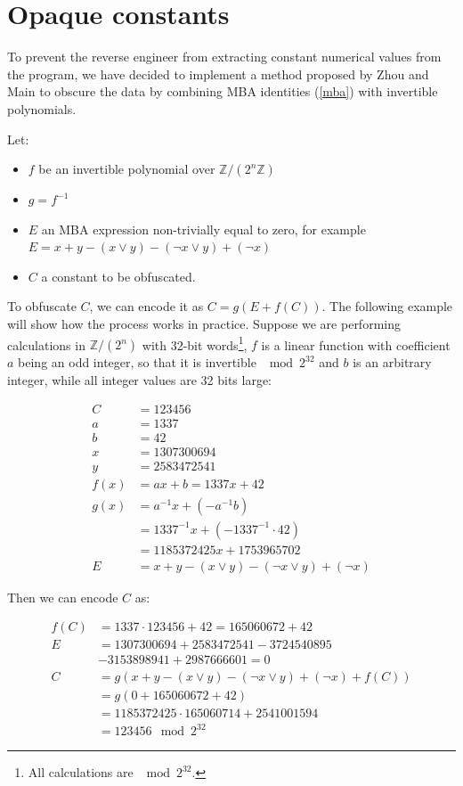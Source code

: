 \documentclass[
  digital, %
  notable,   %
  twoside, %
  nolof,     %
  nolot,     %
]{fithesis3}
\theoremstyle{definition}
\begin{document}
\section{Opaque constants} \label{obf_const}

To prevent the reverse engineer from extracting constant numerical values from the program, we have decided to implement a method proposed by Zhou and Main \cite{mba_zhou} to obscure the data by combining MBA identities (\ref{mba}) with invertible polynomials. 

Let:

\begin{itemize}
    \item $f$ be an invertible polynomial over $\mathbb{Z}/(2^n\mathbb{Z})$
    \item $g = f^{-1}$
    \item $E$ an MBA expression non-trivially equal to zero, for example $E = x + y - (x \vee y)-(\neg x \vee y)+(\neg x)$
    \item $C$ a constant to be obfuscated.
\end{itemize}

To obfuscate $C$, we can encode it as $C = g(E + f(C))$. The following example will show how the process works in practice. Suppose we are performing calculations in $\mathbb{Z}/(2^n)$ with 32-bit words\footnote{All calculations are $\mod{2^{32}}$.}, $f$ is a linear function with coefficient $a$ being an odd integer, so that it is invertible $\mod 2^{32}$ and $b$ is an arbitrary integer, while all integer values are 32 bits large:

\begin{align*}
C & = 123456 \\
a &= 1337 \\
b &= 42\\
x &= 1307300694 \\
y &= 2583472541 \\
f(x) &= ax + b = 1337x + 42\\
g(x) &= a^{-1}x + (-a^{-1}b) \\
&= 1337^{-1}x + (-1337^{-1}\cdot 42) 
\\&= 1185372425x + 1753965702 \\
E &= x + y - (x \vee y)-(\neg x \vee y)+(\neg x)
\end{align*}

Then we can encode $C$ as:

\begin{align*}
    f(C) &= 1337\cdot 123456 + 42 = 165060672 + 42 \\
    E &= 1307300694 + 2583472541 - 3724540895\\& - 3153898941 + 2987666601 = 0 \\
    C &= g(x + y - (x \vee y)-(\neg x \vee y)+(\neg x) + f(C)) \\
    &= g(0 + 165060672 + 42) \\
    &= 1185372425\cdot165060714 + 2541001594\\
    &= 123456 \mod 2^{32}
\end{align*}
\end{document}
